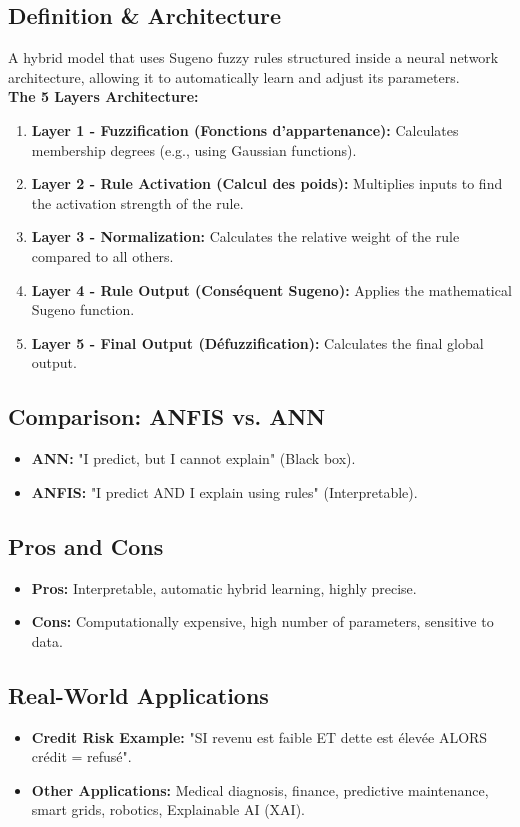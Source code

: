 \documentclass[11pt,a4paper]{article}
\begin{document}
\subsection{Definition \& Architecture}
A hybrid model that uses Sugeno fuzzy rules structured inside a neural network architecture, allowing it to automatically learn and adjust its parameters.
\\
\textbf{The 5 Layers Architecture:}
\begin{enumerate}
    \item \textbf{Layer 1 - Fuzzification (Fonctions d'appartenance):} Calculates membership degrees (e.g., using Gaussian functions).
    \item \textbf{Layer 2 - Rule Activation (Calcul des poids):} Multiplies inputs to find the activation strength of the rule.
    \item \textbf{Layer 3 - Normalization:} Calculates the relative weight of the rule compared to all others.
    \item \textbf{Layer 4 - Rule Output (Conséquent Sugeno):} Applies the mathematical Sugeno function.
    \item \textbf{Layer 5 - Final Output (Défuzzification):} Calculates the final global output.
\end{enumerate}

\subsection{Comparison: ANFIS vs. ANN}
\begin{itemize}
    \item \textbf{ANN:} "I predict, but I cannot explain" (Black box).
    \item \textbf{ANFIS:} "I predict AND I explain using rules" (Interpretable).
\end{itemize}

\subsection{Pros and Cons}
\begin{itemize}
    \item \textbf{Pros:} Interpretable, automatic hybrid learning, highly precise.
    \item \textbf{Cons:} Computationally expensive, high number of parameters, sensitive to data.
\end{itemize}

\subsection{Real-World Applications}
\begin{itemize}
    \item \textbf{Credit Risk Example:} "SI revenu est faible ET dette est élevée ALORS crédit = refusé".
    \item \textbf{Other Applications:} Medical diagnosis, finance, predictive maintenance, smart grids, robotics, Explainable AI (XAI).
\end{itemize}
\end{document}
